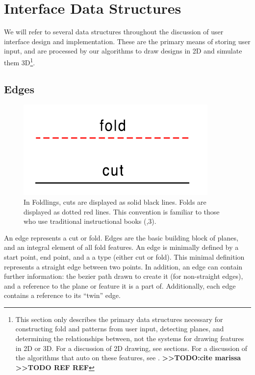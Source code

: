 \section{Interface Data Structures}\label{interface-data-structures}

We will refer to several data structures throughout the discussion of
user interface design and implementation. These are the primary means of
storing user input, and are processed by our algorithms to draw designs
in 2D and simulate them 3D\footnote{This section only describes the
  primary data structures necessary for constructing fold and patterns
  from user input, detecting planes, and determining the relationships
  between, not the systems for drawing features in 2D or 3D. For a
  discussion of 2D drawing, see sections. For a discussion of the
  algorithms that auto on these features, see .
  \textbf{\textgreater{}\textgreater{}TODO:cite marissa
  \textgreater{}\textgreater{}TODO REF REF}}.

\subsection{Edges}\label{edges}

\begin{figure}[htbp]
\centering
\includegraphics{figures/33_UI_Interface_Data_Structures/foldvsedge.pdf}
\caption{In Foldlings, cuts are displayed as solid black lines. Folds
are displayed as dotted red lines. This convention is familiar to those
who use traditional instructional books
(\citet{berenson1972kirigami},3).}
\end{figure}

An edge represents a cut or fold. Edges are the basic building block of
planes, and an integral element of all fold features. An edge is
minimally defined by a start point, end point, and a a type (either cut
or fold). This minimal definition represents a straight edge between two
points. In addition, an edge can contain further information: the bezier
path drawn to create it (for non-straight edges), and a reference to the
plane or feature it is a part of. Additionally, each edge contains a
reference to its ``twin'' edge.

